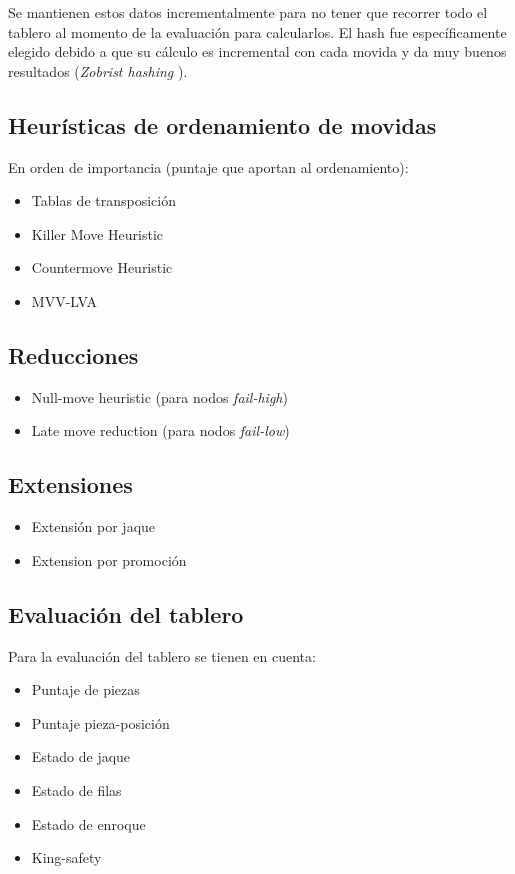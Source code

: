 \documentclass{article}
\begin{document}
Se mantienen estos datos incrementalmente para no tener que recorrer
todo el tablero al momento de la evaluación para calcularlos. El hash
fue específicamente elegido debido a que su cálculo es incremental
con cada movida y da muy buenos resultados (\emph{Zobrist hashing}
\cite{zobrist}).

\subsection{Heurísticas de ordenamiento de movidas}
En orden de importancia (puntaje que aportan al ordenamiento):
\begin{itemize}
\item Tablas de transposición
\item Killer Move Heuristic
\item Countermove Heuristic
\item MVV-LVA
\end{itemize}

\subsection{Reducciones}

\begin{itemize}
\item Null-move heuristic (para nodos \emph{fail-high})
\item Late move reduction (para nodos \emph{fail-low})
\end{itemize}

\subsection{Extensiones}
\begin{itemize}
\item Extensión por jaque
\item Extension por promoción
\end{itemize}

\subsection{Evaluación del tablero}
Para la evaluación del tablero se tienen en cuenta:
\begin{itemize}
\item Puntaje de piezas
\item Puntaje pieza-posición
\item Estado de jaque
\item Estado de filas
\item Estado de enroque
\item King-safety
\end{itemize}
\end{document}
